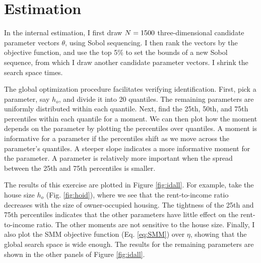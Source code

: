 \documentclass[12pt]{article}
\begin{document}
\section{Estimation}\label{app:SMM}
In the internal estimation, I first draw $N=1500$ three-dimensional candidate parameter vectors $\theta$, using Sobol sequencing. I then rank the vectors by the objective function, and use the top 5\% to set the bounds of a new Sobol sequence, from which I draw another {\parNest} candidate parameter vectors. I shrink the search space {\parNshrinks} times. 

The global optimization procedure facilitates verifying identification. First, pick a parameter, say $h_o$, and divide it into 20 quantiles. The remaining parameters are uniformly distributed within each quantile. Next, find the 25th, 50th, and 75th percentiles within each quantile for a moment. We can then plot how the moment depends on the parameter by plotting the percentiles over quantiles. A moment is informative for a parameter if the percentiles shift as we move across the parameter's quantiles. A steeper slope indicates a more informative moment for the parameter. A parameter is relatively more important when the spread between the 25th and 75th percentiles is smaller. 

The results of this exercise are plotted in Figure \ref{fig:idall}. For example, take the house size $h_o$ (Fig. \ref{fig:hoid}), where we see that the rent-to-income ratio decreases with the size of owner-occupied housing. The tightness of the 25th and 75th percentiles indicates that the other parameters have little effect on the rent-to-income ratio. The other moments are not sensitive to the house size. Finally, I also plot the SMM objective function (Eq. \ref{eq:SMM}) over $\eta$, showing that the global search space is wide enough. The results for the remaining parameters are shown in the other panels of Figure \ref{fig:idall}.
\end{document}
